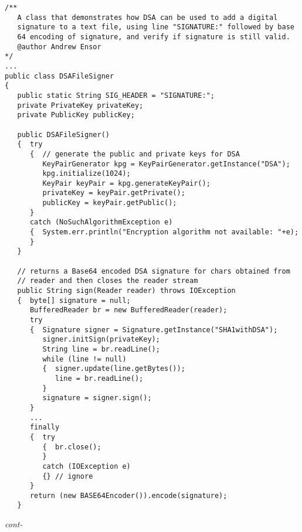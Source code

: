 \begin{figure*}\begin{program}\begin{verbatim}
/**
   A class that demonstrates how DSA can be used to add a digital
   signature to a text file, using line "SIGNATURE:" followed by base
   64 encoding of signature, and verify if signature is still valid.
   @author Andrew Ensor
*/
...
public class DSAFileSigner
{
   public static String SIG_HEADER = "SIGNATURE:";
   private PrivateKey privateKey;
   private PublicKey publicKey;

   public DSAFileSigner()
   {  try
      {  // generate the public and private keys for DSA
         KeyPairGenerator kpg = KeyPairGenerator.getInstance("DSA");
         kpg.initialize(1024);
         KeyPair keyPair = kpg.generateKeyPair();
         privateKey = keyPair.getPrivate();
         publicKey = keyPair.getPublic();
      }
      catch (NoSuchAlgorithmException e)
      {  System.err.println("Encryption algorithm not available: "+e);
      }
   }

   // returns a Base64 encoded DSA signature for chars obtained from
   // reader and then closes the reader stream
   public String sign(Reader reader) throws IOException
   {  byte[] signature = null;
      BufferedReader br = new BufferedReader(reader);
      try
      {  Signature signer = Signature.getInstance("SHA1withDSA");
         signer.initSign(privateKey);
         String line = br.readLine();
         while (line != null)
         {  signer.update(line.getBytes());
            line = br.readLine();
         }
         signature = signer.sign();
      }
      ...
      finally
      {  try
         {  br.close();
         }
         catch (IOException e)
         {} // ignore
      }
      return (new BASE64Encoder()).encode(signature);
   }
\end{verbatim}\hfill \emph{cont-}\end{program}\end{figure*}%
